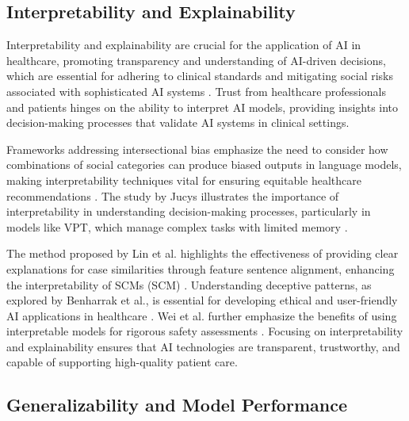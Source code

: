 \subsection{Interpretability and Explainability} \label{subsec:Interpretability and Explainability}

Interpretability and explainability are crucial for the application of AI in healthcare, promoting transparency and understanding of AI-driven decisions, which are essential for adhering to clinical standards and mitigating social risks associated with sophisticated AI systems \cite{lin2023interpretabilityframeworksimilarcase}. Trust from healthcare professionals and patients hinges on the ability to interpret AI models, providing insights into decision-making processes that validate AI systems in clinical settings.

Frameworks addressing intersectional bias emphasize the need to consider how combinations of social categories can produce biased outputs in language models, making interpretability techniques vital for ensuring equitable healthcare recommendations \cite{magee2021intersectionalbiascausallanguage}. The study by Jucys illustrates the importance of interpretability in understanding decision-making processes, particularly in models like VPT, which manage complex tasks with limited memory \cite{jucys2024interpretabilityactionexploratoryanalysis}.

The method proposed by Lin et al. highlights the effectiveness of providing clear explanations for case similarities through feature sentence alignment, enhancing the interpretability of SCMs (SCM) \cite{lin2023interpretabilityframeworksimilarcase}. Understanding deceptive patterns, as explored by Benharrak et al., is essential for developing ethical and user-friendly AI applications in healthcare \cite{benharrak2024deceptivepatternsintelligentinteractive}. Wei et al. further emphasize the benefits of using interpretable models for rigorous safety assessments \cite{wei2022safetyinterpretablemachinelearning}. Focusing on interpretability and explainability ensures that AI technologies are transparent, trustworthy, and capable of supporting high-quality patient care.


\subsection{Generalizability and Model Performance} \label{subsec:Generalizability and Model Performance}



